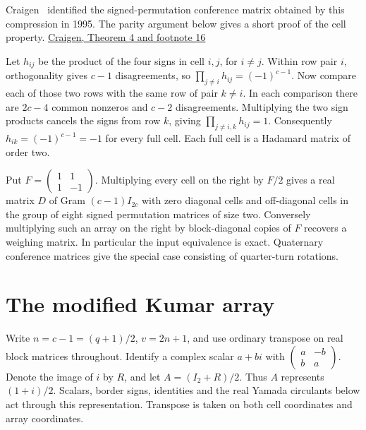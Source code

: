 \documentclass[10pt]{article}
\begin{document}
Craigen~\cite{craigen} identified the signed-permutation conference matrix obtained by this compression in 1995. The parity argument below gives a short proof of the cell property. \href{https://us.ticmeet.com/assets/archivos/d6f1d9b8-d39f-4888-925a-7eb81c4905cc/Craigen_handouts.pdf#page=11}{Craigen, Theorem 4 and footnote 16}

Let $h_{ij}$ be the product of the four signs in cell $i,j$, for $i\ne j$. Within row pair $i$, orthogonality gives $c-1$ disagreements, so $\prod_{j\ne i}h_{ij}=(-1)^{c-1}$. Now compare each of those two rows with the same row of pair $k\ne i$. In each comparison there are $2c-4$ common nonzeros and $c-2$ disagreements. Multiplying the two sign products cancels the signs from row $k$, giving $\prod_{j\ne i,k}h_{ij}=1$. Consequently $h_{ik}=(-1)^{c-1}=-1$ for every full cell. Each full cell is a Hadamard matrix of order two.

Put $F=\left(\begin{smallmatrix}1&1\\1&-1\end{smallmatrix}\right)$. Multiplying every cell on the right by $F/2$ gives a real matrix $D$ of Gram $(c-1)I_{2c}$ with zero diagonal cells and off-diagonal cells in the group of eight signed permutation matrices of size two. Conversely multiplying such an array on the right by block-diagonal copies of $F$ recovers a weighing matrix. In particular the input equivalence is exact. Quaternary conference matrices give the special case consisting of quarter-turn rotations.

\section{The modified Kumar array}

Write $n=c-1=(q+1)/2$, $v=2n+1$, and use ordinary transpose on real block matrices throughout. Identify a complex scalar $a+bi$ with $\left(\begin{smallmatrix}a&-b\\ b&a\end{smallmatrix}\right)$. Denote the image of $i$ by $R$, and let $A=(I_2+R)/2$. Thus $A$ represents $(1+i)/2$. Scalars, border signs, identities and the real Yamada circulants below act through this representation. Transpose is taken on both cell coordinates and array coordinates.
\end{document}
